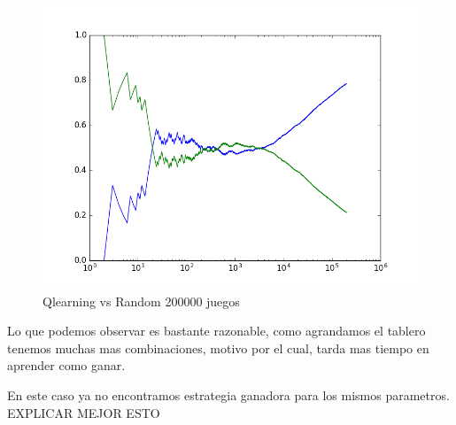 \begin{figure}[h]
 \centering
  \begin{minipage}[c]{1\textwidth}
	\centering
	\includegraphics[scale=0.5]{img/QlearningRandomEgreedy2000007x6(4).png}
        \caption{Qlearning vs Random 200000 juegos}
  \end{minipage}
\end{figure}

Lo que podemos observar es bastante razonable, como agrandamos el tablero tenemos muchas mas combinaciones, motivo por el cual,
 tarda mas tiempo en aprender como ganar.

En este caso ya no encontramos estrategia ganadora para los mismos parametros.
{\huge EXPLICAR MEJOR ESTO}\\


